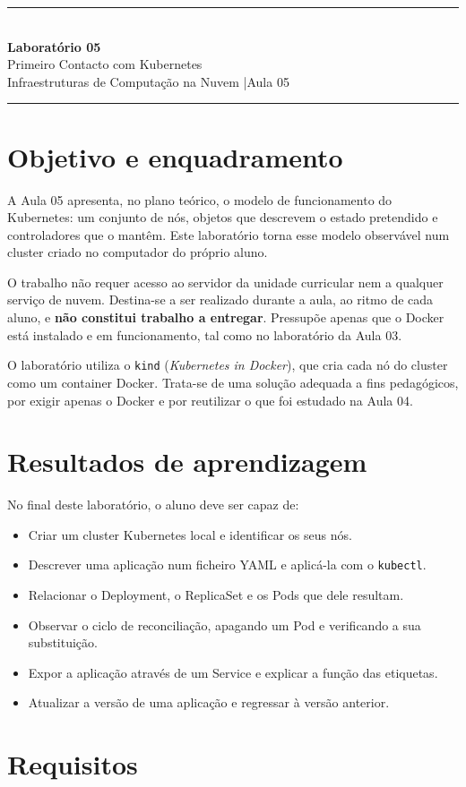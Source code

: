 \documentclass[11pt,a4paper]{article}
\newcommand{\cmd}[1]{\texttt{#1}}
\newcommand{\labtitle}[3]{%
  \thispagestyle{empty}
  \begin{center}
  {\color{NudeTaupe}\rule{\textwidth}{0.5pt}}\\[0.6cm]
  {\LARGE\bfseries\color{TextEspresso} Laboratório #1}\\[0.4cm]
  {\large\color{TextEspresso} #2}\\[0.35cm]
  {\normalsize\color{NudeTaupe} Infraestruturas de Computação na Nuvem \quad|\quad #3}\\[0.5cm]
  {\color{NudeTaupe}\rule{\textwidth}{0.5pt}}
  \end{center}
  \vspace{0.5cm}
}
\begin{document}
\labtitle{05}{Primeiro Contacto com Kubernetes}{Aula 05}

\section*{Objetivo e enquadramento}

A Aula 05 apresenta, no plano teórico, o modelo de funcionamento do Kubernetes: um conjunto de nós, objetos que descrevem o estado pretendido e controladores que o mantêm. Este laboratório torna esse modelo observável num cluster criado no computador do próprio aluno.

O trabalho não requer acesso ao servidor da unidade curricular nem a qualquer serviço de nuvem. Destina-se a ser realizado durante a aula, ao ritmo de cada aluno, e \textbf{não constitui trabalho a entregar}. Pressupõe apenas que o Docker está instalado e em funcionamento, tal como no laboratório da Aula 03.

\begin{nota}
O laboratório utiliza o \cmd{kind} (\emph{Kubernetes in Docker}), que cria cada nó do cluster como um container Docker. Trata-se de uma solução adequada a fins pedagógicos, por exigir apenas o Docker e por reutilizar o que foi estudado na Aula 04.
\end{nota}

\section*{Resultados de aprendizagem}

No final deste laboratório, o aluno deve ser capaz de:

\begin{itemize}
  \item Criar um cluster Kubernetes local e identificar os seus nós.
  \item Descrever uma aplicação num ficheiro YAML e aplicá-la com o \cmd{kubectl}.
  \item Relacionar o Deployment, o ReplicaSet e os Pods que dele resultam.
  \item Observar o ciclo de reconciliação, apagando um Pod e verificando a sua substituição.
  \item Expor a aplicação através de um Service e explicar a função das etiquetas.
  \item Atualizar a versão de uma aplicação e regressar à versão anterior.
\end{itemize}

\section*{Requisitos}
\end{document}
